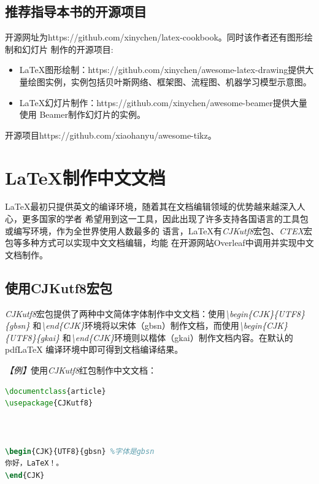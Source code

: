 \subsection{推荐指导本书的开源项目}
开源网址为https://github.com/xinychen/latex-cookbook。同时该作者还有图形绘制和幻灯片
制作的开源项目:
\begin{itemize}
      \item LaTeX图形绘制：https://github.com/xinychen/awesome-latex-drawing提供大
            量绘图实例，实例包括贝叶斯网络、框架图、流程图、机器学习模型示意图。
      \item LaTeX幻灯片制作：https://github.com/xinychen/awesome-beamer提供大量使用
            Beamer制作幻灯片的实例。
\end{itemize}

\begin{tcolorbox}[colback=red!5!white, colframe=red!50!black, title=参考资料]
      开源项目https://github.com/xiaohanyu/awesome-tikz。
\end{tcolorbox}

\section{\LaTeX 制作中文文档}
LaTeX最初只提供英文的编译环境，随着其在文档编辑领域的优势越来越深入人心，更多国家的学者
希望用到这一工具，因此出现了许多支持各国语言的工具包或编写环境，作为全世界使用人数最多的
语言，LaTeX有\emph{CJKutf8}宏包、\emph{CTEX}宏包等多种方式可以实现中文文档编辑，均能
在开源网站Overleaf中调用并实现中文文档制作。

\subsection{使用CJKutf8宏包}
\emph{CJKutf8}宏包提供了两种中文简体字体制作中文文档：使用\emph{\textbackslash begin\{CJK\}\{UTF8\}\{gbsn\}}
和\emph{\textbackslash end\{CJK\}}环境将以宋体（gbsn）制作文档，而使用\emph{\textbackslash begin\{CJK\}\{UTF8\}\{gkai\}}
和\emph{\textbackslash end\{CJK\}}环境则以楷体（gkai）制作文档内容。在默认的pdfLaTeX
编译环境中即可得到文档编译结果。

\emph{【例】}使用\emph{CJKutf8}红包制作中文文档：
\begin{lstlisting}[language=TeX, caption={CJKutf8示例}]
\documentclass{article}
\usepackage{CJKutf8}



\begin{CJK}{UTF8}{gbsn} %字体是gbsn
你好，LaTeX！。
\end{CJK}


\end{lstlisting}

